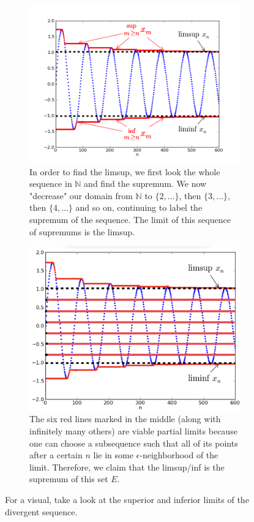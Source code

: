   \begin{figure}[H]
    \centering
    \begin{subfigure}[b]{0.48\textwidth}
      \centering 
      \includegraphics[scale=0.38]{img/Lim_sup_example.png}
      \caption{In order to find the limsup, we first look the whole sequence in $\mathbb{N}$ and find the supremum. We now "decrease" our domain from $\mathbb{N}$ to $\{2, \ldots\}$, then $\{3, \ldots\}$, then $\{4, \ldots\}$ and so on, continuing to label the supremum of the sequence. The limit of this sequence of supremums is the limsup.} 
      \label{fig:limsup1}
    \end{subfigure}
    \hfill 
    \begin{subfigure}[b]{0.48\textwidth}
    \centering
      \includegraphics[scale=0.095]{img/Sup_Inf_Limits_as_Limit_Bounds.jpeg}
      \caption{The six red lines marked in the middle (along with infinitely many others) are viable partial limits because one can choose a subsequence such that all of its points after a certain $n$ lie in some $\epsilon$-neighborhood of the limit. Therefore, we claim that the limsup/inf is the supremum of this set $E$.}
      \label{fig:limsup2}
    \end{subfigure}
    \caption{For a visual, take a look at the superior and inferior limits of the divergent sequence. }
    \label{fig:limsup}
  \end{figure}

